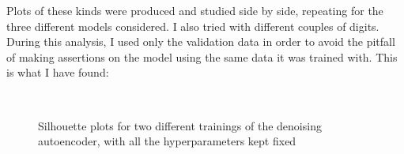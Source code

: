 \documentclass[twocolumn,gsifonts,twoside]{gsipaper}
\begin{document}
Plots of these kinds were produced and studied side by side, repeating for the three different models considered. I also tried with different couples of digits. During this analysis, I used only the validation data in order to avoid the pitfall of making assertions on the model using the same data it was trained with.
 This is what I have found:
\begin{figure}[htb]
  \\
  \caption{Silhouette plots for two different trainings of the denoising autoencoder, with all the hyperparameters kept fixed}
  \label{fig:s_score}
\end{figure}
\end{document}
